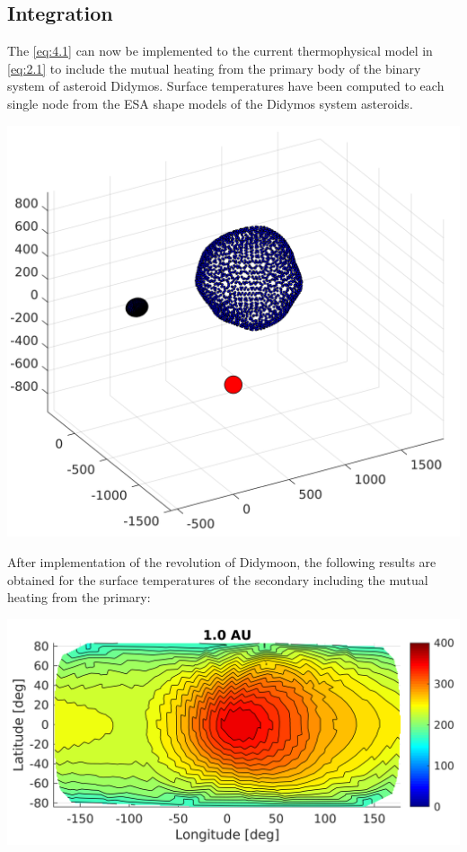 \subsection{Integration}
The \autoref{eq:4.1} can now be implemented to the current thermophysical model in \autoref{eq:2.1} to include the mutual heating from the primary body of the binary system of asteroid Didymos. Surface temperatures have been computed to each single node from the ESA shape models of the Didymos system asteroids.
\begin{center}
    \includegraphics[width=0.9\linewidth]{rsc/mutual_model.png}
    \label{fig:4.2}
\end{center}
After implementation of the revolution of Didymoon, the following results are obtained for the surface temperatures of the secondary including the mutual heating from the primary:
\begin{center}
    \includegraphics[width=\linewidth]{rsc/mutual.png}
    \label{fig:4.3}
\end{center}
